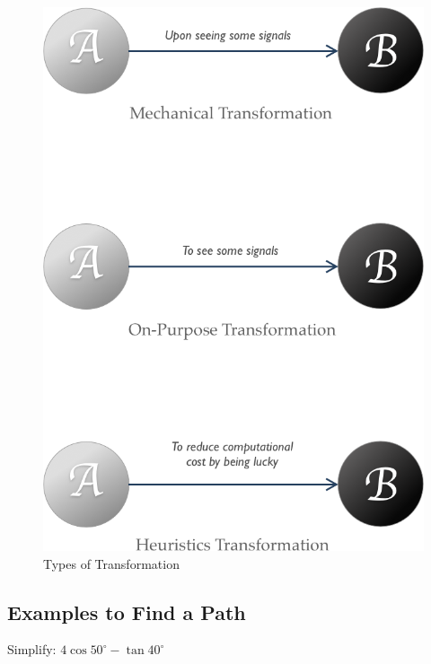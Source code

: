 \begin{figure}
  \centerline{\includegraphics[width=0.8\linewidth]{img/transformations.png}}
  \caption{Types of Transformation}
  \label{fig:transformation}
\end{figure}

%
%


\subsection{Examples to Find a Path}

\begin{example}
  Simplify: $ 4\cos 50^\circ - \tan 40^\circ $
\end{example}
